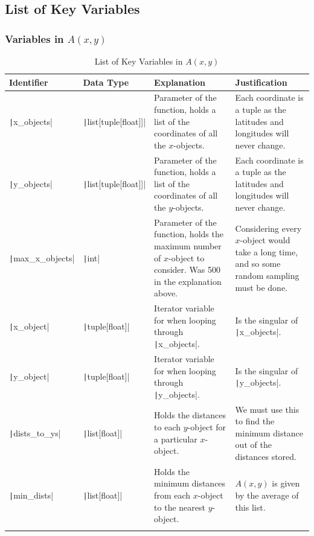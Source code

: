 \documentclass[12pt]{report}
\newcommand{\pil}[1]{\protect\texttt|#1|}
\begin{document}
\subsection{List of Key Variables}
\subsubsection{Variables in $A\left(x,y\right)$}
\begin{center}
\begin{longtable}{ | m{3cm} | m{4cm}| m{4cm} | m{4cm} |} 
    \hline
    \textbf{Identifier} & \textbf{Data Type} & \textbf{Explanation}  & \textbf{Justification} \\ 
    \hline
    \pil{x_objects} & \pil{list[tuple[float]]} & Parameter of the function, holds a list of the coordinates of all the $x$-objects. & Each coordinate is a tuple as the latitudes and longitudes will never change. \\ 
    \hline
    \pil{y_objects} & \pil{list[tuple[float]]} & Parameter of the function, holds a list of the coordinates of all the $y$-objects. & Each coordinate is a tuple as the latitudes and longitudes will never change. \\ 
    \hline
    \pil{max_x_objects} & \pil{int} & Parameter of the function, holds the maximum number of $x$-object to consider. Was 500 in the explanation above. & Considering every $x$-object would take a long time, and so some random sampling must be done. \\ 
    \hline
    \pil{x_object} & \pil{tuple[float]} & Iterator variable for when looping through \pil{x_objects}. & Is the singular of \pil{x_objects}. \\ 
    \hline
    \pil{y_object} & \pil{tuple[float]} & Iterator variable for when looping through \pil{y_objects}. & Is the singular of \pil{y_objects}. \\ 
    \hline
    \pil{dists_to_ys} & \pil{list[float]} & Holds the distances to each $y$-object for a particular $x$-object. & We must use this to find the minimum distance out of the distances stored. \\ 
    \hline
    \pil{min_dists} & \pil{list[float]} & Holds the minimum distances from each $x$-object to the nearest $y$-object. & $A\left(x,y\right)$ is given by the average of this list. \\ 
    \hline
\caption{List of Key Variables in $A\left(x,y\right)$}
\end{longtable}
\end{center}
\end{document}
